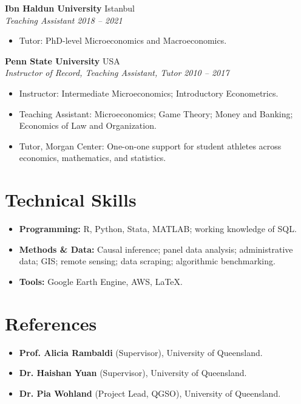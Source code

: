 \documentclass[11pt,a4paper]{article}
\newcommand{\entry}[4]{
    \noindent \textbf{#1} \hfill {\color{secondary}#2} \\
    \textit{#3} \hfill \textit{\color{secondary}#4}\vspace{1mm}
}
\begin{document}
\entry{Ibn Haldun University}{Istanbul}{Teaching Assistant}{2018 -- 2021}
\begin{itemize}
    \item Tutor: PhD-level Microeconomics and Macroeconomics.
\end{itemize}

\entry{Penn State University}{USA}{Instructor of Record, Teaching Assistant, Tutor}{2010 -- 2017}
\begin{itemize}
    \item Instructor: Intermediate Microeconomics; Introductory Econometrics.
    \item Teaching Assistant: Microeconomics; Game Theory; Money and Banking; Economics of Law and Organization.
    \item Tutor, Morgan Center: One-on-one support for student athletes across economics, mathematics, and statistics.
\end{itemize}

\section{Technical Skills}
\begin{itemize}
    \item \textbf{Programming:} R, Python, Stata, MATLAB; working knowledge of SQL.
    \item \textbf{Methods \& Data:} Causal inference; panel data analysis; administrative data; GIS; remote sensing; data scraping; algorithmic benchmarking.
    \item \textbf{Tools:} Google Earth Engine, AWS, \LaTeX.
\end{itemize}

\section{References}
\begin{itemize}
    \item \textbf{Prof. Alicia Rambaldi} (Supervisor), University of Queensland. %
    \item \textbf{Dr. Haishan Yuan} (Supervisor), University of Queensland. %
    \item \textbf{Dr. Pia Wohland} (Project Lead, QGSO), University of Queensland. %
\end{itemize}
\end{document}
